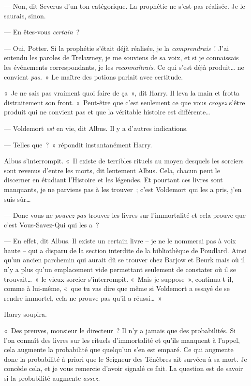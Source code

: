 --- Non, dit Severus d'un ton catégorique. La prophétie ne s'est pas réalisée. Je le saurais, sinon.

--- En êtes-vous \emph{certain}~?

--- Oui, Potter. Si la prophétie s'était déjà réalisée, je la \emph{comprendrais}~! J'ai entendu les paroles de Trelawney, je me souviens de sa voix, et si je connaissais les événements correspondants, je les \emph{reconnaîtrais}. Ce qui s'est déjà produit… ne convient \emph{pas}.~» Le maître des potions parlait avec certitude.

«~Je ne sais pas vraiment quoi faire de ça~», dit Harry. Il leva la main et frotta distraitement son front. «~Peut-être que c'est seulement ce que vous \emph{croyez} s'être produit qui ne convient pas et que la véritable histoire est différente…

--- Voldemort \emph{est} en vie, dit Albus. Il y a d'autres indications.

--- Telles que~?~» répondit instantanément Harry.

Albus s'interrompit. «~Il existe de terribles rituels au moyen desquels les sorciers sont revenus d'entre les morts, dit lentement Albus. Cela, chacun peut le discerner en étudiant l'Histoire et les légendes. Et pourtant ces livres sont manquants, je ne parviens pas à les trouver~; c'est Voldemort qui les a pris, j'en suis sûr…

--- Donc vous ne \emph{pouvez pas} trouver les livres sur l'immortalité et cela prouve que c'est Vous-Savez-Qui qui les a~?

--- En effet, dit Albus. Il existe un certain livre -- je ne le nommerai pas à voix haute -- qui a disparu de la section interdite de la bibliothèque de Poudlard. Ainsi qu'un ancien parchemin qui aurait dû se trouver chez Barjow et Beurk mais où il n'y a plus qu'un emplacement vide permettant seulement de constater où il se trouvait…~» le vieux sorcier s'interrompit. «~Mais je suppose~», continua-t-il, comme à lui-même, «~que tu vas dire que même si Voldemort a essayé de se rendre immortel, cela ne prouve pas qu'il a réussi…~»

Harry soupira.

«~Des preuves, monsieur le directeur~? Il n'y a jamais que des probabilités. Si l'on connaît des livres sur les rituels d'immortalité et qu'ils manquent à l'appel, cela augmente la probabilité que quelqu'un s'en est emparé. Ce qui augmente donc la probabilité à priori que le Seigneur des Ténèbres ait survécu à sa mort. Je concède cela, et je vous remercie d'avoir signalé ce fait. La question est de savoir si la probabilité augmente \emph{assez}.

